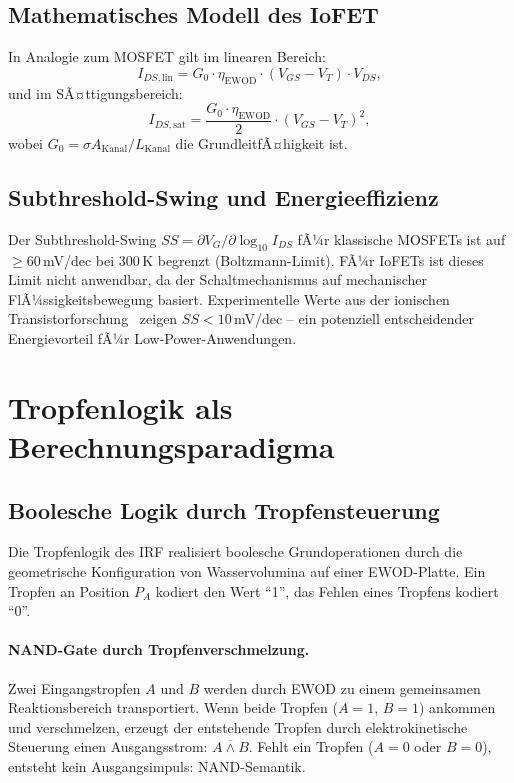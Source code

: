 ﻿\documentclass[a4paper,12pt]{scrreprt}
\theoremstyle{definition}
\begin{document}
\subsection{Mathematisches Modell des IoFET}

In Analogie zum MOSFET gilt im linearen Bereich:
\begin{equation}
  I_{DS,\mathrm{lin}} = G_0 \cdot \eta_{\mathrm{EWOD}} \cdot (V_{GS} - V_T) \cdot V_{DS},
\end{equation}
und im SÃ¤ttigungsbereich:
\begin{equation}
  I_{DS,\mathrm{sat}} = \frac{G_0 \cdot \eta_{\mathrm{EWOD}}}{2} \cdot (V_{GS} - V_T)^2,
\end{equation}
wobei $G_0 = \sigma A_{\mathrm{Kanal}} / L_{\mathrm{Kanal}}$ die GrundleitfÃ¤higkeit ist.

\subsection{Subthreshold-Swing und Energieeffizienz}

Der Subthreshold-Swing $SS = \partial V_G / \partial \log_{10} I_{DS}$ fÃ¼r
klassische MOSFETs ist auf $\geq 60$\,mV/dec bei 300\,K begrenzt (Boltzmann-Limit).
FÃ¼r IoFETs ist dieses Limit nicht anwendbar, da der Schaltmechanismus auf
mechanischer FlÃ¼ssigkeitsbewegung basiert. Experimentelle Werte aus der
ionischen Transistorforschung~\cite{xu2021} zeigen $SS < 10$\,mV/dec -- ein
potenziell entscheidender Energievorteil fÃ¼r Low-Power-Anwendungen.

\section{Tropfenlogik als Berechnungsparadigma}

\subsection{Boolesche Logik durch Tropfensteuerung}

Die Tropfenlogik des IRF realisiert boolesche Grundoperationen durch die
geometrische Konfiguration von Wasservolumina auf einer EWOD-Platte.
Ein Tropfen an Position $P_A$ kodiert den Wert ``1'', das Fehlen eines
Tropfens kodiert ``0''.

\paragraph{NAND-Gate durch Tropfenverschmelzung.}
Zwei Eingangstropfen $A$ und $B$ werden durch EWOD zu einem gemeinsamen
Reaktionsbereich transportiert. Wenn beide Tropfen ($A = 1$, $B = 1$) ankommen
und verschmelzen, erzeugt der entstehende Tropfen durch elektrokinetische
Steuerung einen Ausgangsstrom: $\overline{A \wedge B}$. Fehlt ein Tropfen
($A = 0$ oder $B = 0$), entsteht kein Ausgangsimpuls: NAND-Semantik.
\end{document}
